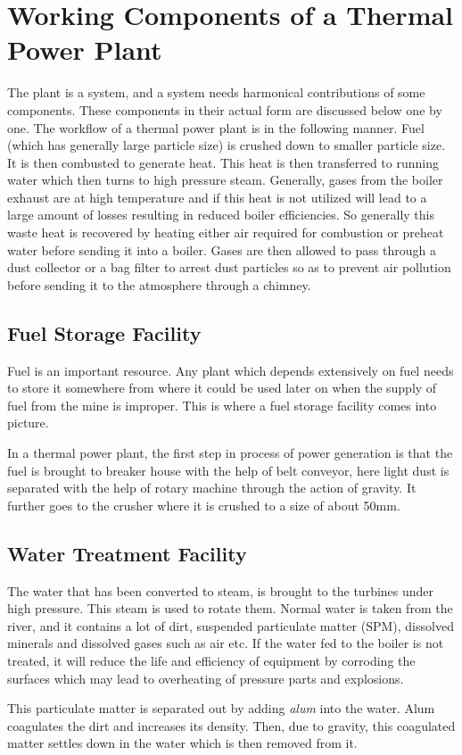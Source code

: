 \documentclass{report}
\begin{document}
\section{Working Components of a Thermal Power Plant}
The plant is a system, and a system needs harmonical contributions of some components. These components in their actual form are discussed below one by one. The workflow of a thermal power plant is in the following manner. Fuel (which has generally large particle size) is crushed down to smaller particle size. It is then combusted to generate heat. This heat is then transferred to running water which then turns to high pressure steam. Generally, gases from the boiler exhaust are at high temperature and if this heat is not utilized will lead to a large amount of losses resulting in reduced boiler efficiencies. So generally this waste heat is recovered by heating either air required for combustion or preheat water before sending it into a boiler. Gases are then allowed to pass through a dust collector or a bag filter to arrest dust particles so as to prevent air pollution before sending it to the atmosphere through a chimney.
\subsection{Fuel Storage Facility}
Fuel is an important resource. Any plant which depends extensively on fuel needs to store it somewhere from where it could be used later on when the supply of fuel from the mine is improper. This is where a fuel storage facility comes into picture. \par In a thermal power plant, the first step in process of power generation is that the fuel is brought to breaker house with the help of belt conveyor, here light dust is separated with the help of rotary machine through the action of gravity. It further goes to the crusher where it is crushed to a size of about 50mm.
\subsection{Water Treatment Facility}
The water that has been converted to steam, is brought to the turbines under high pressure. This steam is used to rotate them. Normal water is taken from the river, and it contains a lot of dirt, suspended particulate matter (SPM), dissolved minerals and dissolved gases such as air etc. If the water fed to the boiler is not treated, it will reduce the life and efficiency of equipment by corroding the surfaces which may lead to overheating of pressure parts and explosions. \par This particulate matter is separated out by adding {\it alum} into the water. Alum coagulates the dirt and increases its density. Then, due to gravity, this coagulated matter settles down in the water which is then removed from it. 
\end{document}
